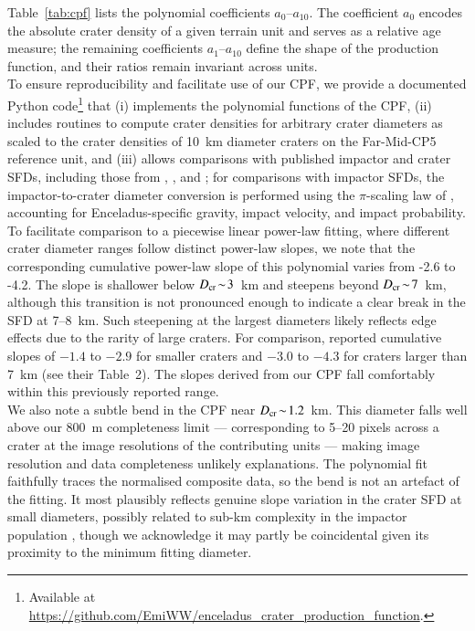 \documentclass[preprint,11pt,3p,times,authoryear]{elsarticle}
\begin{document}
Table~\ref{tab:cpf} lists the polynomial coefficients $a_{0}$–$a_{10}$. The coefficient $a_{0}$ encodes the absolute crater density of a given terrain unit and serves as a relative age measure; the remaining coefficients $a_{1}$–$a_{10}$ define the shape of the production function, and their ratios remain invariant across units.\\

To ensure reproducibility and facilitate use of our CPF, we provide a documented Python code\footnote{Available at \url{https://github.com/EmiWW/enceladus_crater_production_function}.} that (i) implements the polynomial functions of the CPF, (ii) includes routines to compute crater densities for arbitrary crater diameters as scaled to the crater densities of 10~km diameter craters on the Far-Mid-CP5 reference unit, and (iii) allows comparisons with published impactor and crater SFDs, including those from \citet{Kirchoff2009}, \citet{Zahnle2003}, and \citet{Singer2019}; for comparisons with impactor SFDs, the impactor-to-crater diameter conversion is performed using the $\pi$-scaling law of \citet{Zahnle2003}, accounting for Enceladus-specific gravity, impact velocity, and impact probability.\\

To facilitate comparison to a piecewise linear power-law fitting, where different crater diameter ranges follow distinct power-law slopes, we note that the corresponding cumulative power-law slope of this polynomial varies from -2.6 to -4.2.
The slope is shallower below $D_{\rm cr}\!\sim\!3$~km and steepens beyond $D_{\rm cr}\!\sim\!7$~km, although this transition is not pronounced enough to indicate a clear break in the SFD at 7--8~km. Such steepening at the largest diameters likely reflects edge effects due to the rarity of large craters.
For comparison, \citet{Kirchoff2009} reported cumulative slopes of $-1.4$ to $-2.9$
for smaller craters and $-3.0$ to $-4.3$ for craters larger than 7~km (see their Table~2). The slopes derived from our CPF fall comfortably within this previously reported range.\\

We also note a subtle bend in the CPF near $D_{\rm cr}\!\sim\!1.2$~km. This diameter falls well above our 800~m completeness limit — corresponding to 5--20 pixels across a crater at the image resolutions of the contributing units — making image resolution and data completeness unlikely explanations. The polynomial fit faithfully traces the normalised composite data, so the bend is not an artefact of the fitting. It most plausibly reflects genuine slope variation in the crater SFD at small diameters, possibly related to sub-km complexity in the impactor population \citep{Bottke2024}, though we acknowledge it may partly be coincidental given its proximity to the minimum fitting diameter.\\
\end{document}
